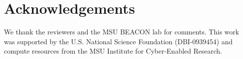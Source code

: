 \vspace*{-2mm}
\section{Acknowledgements}
We thank the reviewers and the MSU BEACON lab for comments. 
This work was supported by the U.S. National Science Foundation (DBI-0939454) and compute resources from the MSU Institute for Cyber-Enabled Research.